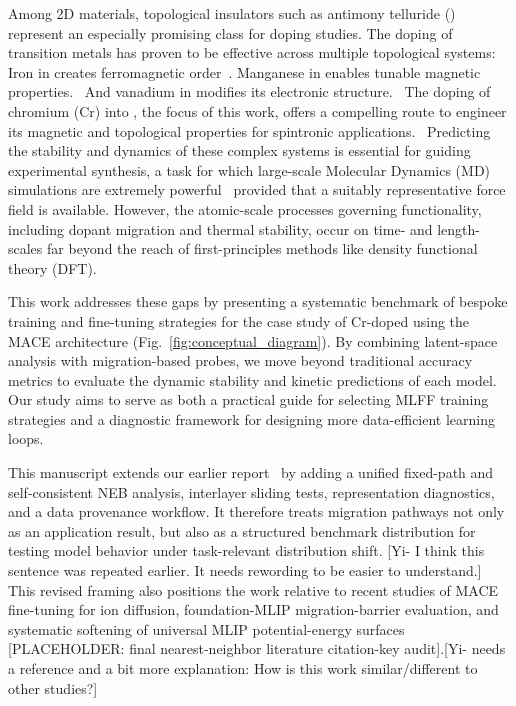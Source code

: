 \documentclass[pdflatex,sn-mathphys-num]{sn-jnl}%
\providecommand{\reviewermap}[3]{}
\theoremstyle{thmstyleone}%
\theoremstyle{thmstyletwo}%
\theoremstyle{thmstylethree}%
\begin{document}
Among 2D materials, topological insulators such as antimony telluride ()~\citep{zhang_topological_2009, guo_roadmap_2015} represent an especially promising class for doping studies. The doping of transition metals has proven to be effective across multiple topological systems: Iron in  creates ferromagnetic order~\citep{checkelsky_trajectory_2014, kulbachinskii_thermoelectric_2012, haazen_ferromagnetism_2012}. Manganese in  enables tunable magnetic properties.~\citep{klimovskikh_tunable_2020, fu_electronic_2021} And vanadium in  modifies its electronic structure.~\citep{sun_sb2te3_2023, zhang_quantum_2021} The doping of chromium (Cr) into , the focus of this work, offers a compelling route to engineer its magnetic and topological properties for spintronic applications.~\citep{cortie_creating_2020,han_effect_2013,de_a_deus_magnetic_2021} Predicting the stability and dynamics of these complex systems is essential for guiding experimental synthesis, a task for which large-scale Molecular Dynamics (MD) simulations are extremely powerful~\citep{Zhang2023TuningStudy,thompson_lammps_2022} provided that a suitably representative force field is available. However, the atomic-scale processes governing functionality, including dopant migration and thermal stability, occur on time- and length- scales far beyond the reach of first-principles methods like density functional theory (DFT).~\citep{kohn_self-consistent_1965, perdew_generalized_1996, sohier_density_2017,choudhary_high-throughput_2017}

This work addresses these gaps by presenting a systematic benchmark of bespoke training and fine-tuning strategies for the case study of Cr-doped  using the MACE architecture (Fig.~\ref{fig:conceptual_diagram}). By combining latent-space analysis with migration-based probes, we move beyond traditional accuracy metrics to evaluate the dynamic stability and kinetic predictions of each model. Our study aims to serve as both a practical guide for selecting MLFF training strategies and a diagnostic framework for designing more data-efficient learning loops. 
\reviewermap{REV-A7}{done-local}{Add nearest-neighbor literature and state the delta relative to the earlier arXiv/workshop report.}
This manuscript extends our earlier report~\citep{cao2025migration} by adding a unified fixed-path and self-consistent NEB analysis, interlayer sliding tests, representation diagnostics, and a data provenance workflow. It therefore treats migration pathways not only as an application result, but also as a structured benchmark distribution for testing model behavior under task-relevant distribution shift. [Yi- I think this sentence was repeated earlier. It needs rewording to be easier to understand.] This revised framing also positions the work relative to recent studies of MACE fine-tuning for ion diffusion, foundation-MLIP migration-barrier evaluation, and systematic softening of universal MLIP potential-energy surfaces [PLACEHOLDER: final nearest-neighbor literature citation-key audit].[Yi- needs a reference and a bit more explanation: How is this work similar/different to other studies?]
\end{document}
